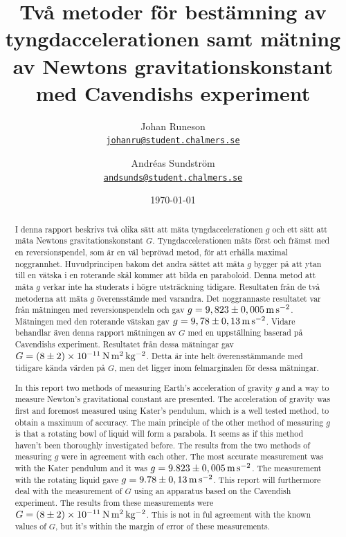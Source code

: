 \documentclass[11pt,a4paper]{article}
\begin{document}
\title{Två metoder för bestämning av tyngdaccelerationen samt mätning av Newtons gravitationskonstant med Cavendishs experiment}
\author{Johan Runeson\\
\href{mailto:johanru@student.chalmers.se}{\nolinkurl{johanru@student.chalmers.se}}
\and 
Andréas Sundström \\ 
\href{mailto:andsunds@student.chalmers.se}{\nolinkurl{andsunds@student.chalmers.se}}
}
\date{\specialdate\today}
\begin{titlepage}


\maketitle


\renewcommand\abstractname{Sammandrag}
\begin{abstract}
\noindent I denna rapport beskrivs två olika sätt att mäta tyngdaccelerationen $g$ och ett sätt att mäta Newtons gravitationskonstant $G$. Tyngdaccelerationen mäts först och främst med en reversionspendel, som är en väl beprövad metod, för att erhålla maximal noggrannhet. Huvudprincipen bakom det andra sättet att mäta $g$ bygger på att ytan till en vätska i en roterande skål kommer att bilda en paraboloid. Denna metod att mäta $g$ verkar inte ha studerats i högre utsträckning tidigare. Resultaten från de två metoderna att mäta $g$ överensstämde med varandra. Det noggrannaste resultatet var från mätningen med reversionspendeln och gav $g=\unit[9,823\pm 0,005]{m\,s^{-2}}$. Mätningen med den roterande vätskan gav $g=\unit[9,78\pm 0,13]{m\,s^{-2}}$. Vidare behandlar även denna rapport mätningen av $G$ med en uppställning baserad på Cavendishs experiment. Resultatet från dessa mätningar gav $G=\unit[(8\pm2)\times 10^{-11}]{N\,m^2\,kg^{-2}}$. Detta är inte helt överensstämmande med tidigare kända värden på $G$, men det ligger inom felmarginalen för dessa mätningar. 

\end{abstract}


\renewcommand\abstractname{Abstract}
\begin{abstract}
\noindent In this report two methods of measuring Earth's acceleration of gravity $g$ and a way to measure Newton's gravitational constant are presented. The acceleration of gravity was first and foremost measured using Kater's pendulum, which is a well tested method, to obtain a maximum of accuracy. The main principle of the other method of measuring $g$ is that a rotating bowl of liquid will form a parabola. It seems as if this method haven't been thoroughly investigated before. The results from the two methods of measuring $g$ were in agreement with each other. The most accurate measurement was with the Kater pendulum and it was $g=\unit[9.823\pm 0,005]{m\,s^{-2}}$. The measurement with the rotating liquid gave $g=\unit[9.78\pm 0,13]{m\,s^{-2}}$. This report will furthermore deal with the measurement of $G$ using an apparatus based on the Cavendish experiment. The results from these measurements were $G=\unit[(8\pm2)\times 10^{-11}]{N\,m^2\,kg^{-2}}$. This is not in ful agreement with the known values of $G$, but it's within the margin of error of these measurements. 


\end{abstract}
\end{titlepage}
\end{document}
